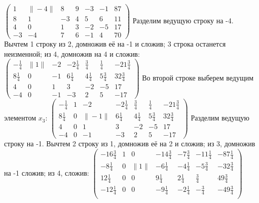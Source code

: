 \documentclass[a4paper,14pt]{extarticle}
\begin{document}
$\begin{pmatrix}
        1  & \|-4\| & 8  & 9 & -3 & -1 & 87 \\
        8  & 1      & -3 & 4 & 5  & 6  & 11 \\
        4  & 0      & 1  & 3 & -2 & -5 & 17 \\
        -3 & -4     & 7  & 6 & -1 & 4  & 70
    \end{pmatrix}$\bigbreak
Разделим ведущую строку на -4. Вычтем 1 строку из 2, домножив её на -1 и сложив; 3 строка останется неизменной; из 4, домножив на 4 и сложив:\bigbreak
$\begin{pmatrix}
        -\frac{1}{4} & \|1\| & -2 & -2\frac{1}{4} & \frac{3}{4}  & \frac{1}{4}  & -21\frac{3}{4} \\
        8\frac{1}{4} & 0     & -1 & 6\frac{1}{4}  & 4\frac{1}{4} & 5\frac{3}{4} & 32\frac{3}{4}  \\
        4            & 0     & 1  & 3             & -2           & -5           & 17             \\
        -4           & 0     & -1 & -3            & 2            & 5            & -17
    \end{pmatrix}$\bigbreak
Во второй строке выберем ведущим элементом $x_3$:\bigbreak
$\begin{pmatrix}
        -\frac{1}{4} & 1 & -2     & -2\frac{1}{4} & \frac{3}{4}  & \frac{1}{4}  & -21\frac{3}{4} \\
        8\frac{1}{4} & 0 & \|-1\| & 6\frac{1}{4}  & 4\frac{1}{4} & 5\frac{3}{4} & 32\frac{3}{4}  \\
        4            & 0 & 1      & 3             & -2           & -5           & 17             \\
        -4           & 0 & -1     & -3            & 2            & 5            & -17
    \end{pmatrix}$\bigbreak
Разделим ведущую строку на -1. Вычтем 2 строку из 1, домножив её на 2 и сложив; из 3, домножив на -1 сложив; из 4, сложив:\bigbreak
$\begin{pmatrix}
        -16\frac{3}{4} & 1 & 0     & -14\frac{3}{4} & -7\frac{3}{4} & -11\frac{1}{4} & -87\frac{1}{4} \\
        -8\frac{1}{4}  & 0 & \|1\| & -6\frac{1}{4}  & -4\frac{1}{4} & -5\frac{3}{4}  & -32\frac{3}{4} \\
        12\frac{1}{4}  & 0 & 0     & 9\frac{1}{4}   & 2\frac{1}{4}  & \frac{3}{4}    & 49\frac{3}{4}  \\
        -12\frac{1}{4} & 0 & 0     & -9\frac{1}{4}  & -2\frac{1}{4} & -\frac{3}{4}   & -49\frac{3}{4} \\
    \end{pmatrix}$\bigbreak
\end{document}
